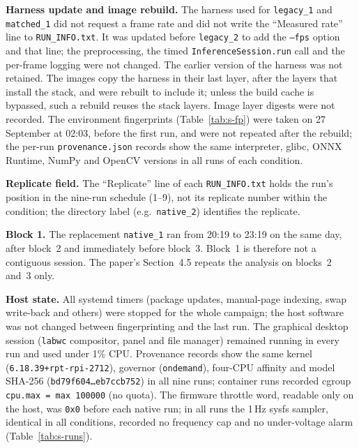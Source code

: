 \documentclass[10pt]{article}
\begin{document}
\textbf{Harness update and image rebuild.} The harness used for \texttt{legacy\_1} and \texttt{matched\_1} did not request a frame rate and did not write the ``Measured rate'' line to \texttt{RUN\_INFO.txt}. It was updated before \texttt{legacy\_2} to add the \texttt{--fps} option and that line; the preprocessing, the timed \texttt{InferenceSession.run} call and the per-frame logging were not changed. The earlier version of the harness was not retained. The images copy the harness in their last layer, after the layers that install the stack, and were rebuilt to include it; unless the build cache is bypassed, such a rebuild reuses the stack layers. Image layer digests were not recorded. The environment fingerprints (Table~\ref{tab:s-fp}) were taken on 27 September at 02:03, before the first run, and were not repeated after the rebuild; the per-run \texttt{provenance.json} records show the same interpreter, glibc, ONNX Runtime, NumPy and OpenCV versions in all runs of each condition.

\textbf{Replicate field.} The ``Replicate'' line of each \texttt{RUN\_INFO.txt} holds the run's position in the nine-run schedule (1--9), not its replicate number within the condition; the directory label (e.g.\ \texttt{native\_2}) identifies the replicate.

\textbf{Block 1.} The replacement \texttt{native\_1} ran from 20:19 to 23:19 on the same day, after block~2 and immediately before block~3. Block~1 is therefore not a contiguous session. The paper's Section~4.5 repeats the analysis on blocks~2 and~3 only.

\textbf{Host state.} All systemd timers (package updates, manual-page indexing, swap write-back and others) were stopped for the whole campaign; the host software was not changed between fingerprinting and the last run. The graphical desktop session (\texttt{labwc} compositor, panel and file manager) remained running in every run and used under 1\% CPU. Provenance records show the same kernel (\texttt{6.18.39+rpt-rpi-2712}), governor (\texttt{ondemand}), four-CPU affinity and model SHA-256 (\texttt{bd79f604\ldots eb7ccb752}) in all nine runs; container runs recorded cgroup \texttt{cpu.max = max 100000} (no quota). The firmware throttle word, readable only on the host, was \texttt{0x0} before each native run; in all runs the 1\,Hz sysfs sampler, identical in all conditions, recorded no frequency cap and no under-voltage alarm (Table~\ref{tab:s-runs}).


\end{document}
